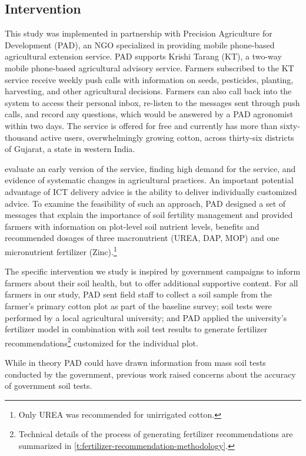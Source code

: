 \documentclass{article}
\begin{document}
\subsection{Intervention}

This study was implemented in partnership with Precision Agriculture for Development (PAD), an NGO specialized in providing mobile phone-based agricultural extension service. PAD supports Krishi Tarang (KT), a two-way mobile phone-based agricultural advisory service. Farmers subscribed to the KT service receive weekly push calls with information on seeds,  pesticides, planting, harvesting, and other agricultural decisions. Farmers can also call back into the system to access their personal inbox, re-listen to the messages sent through push calls, and record any questions, which would be answered by a PAD agronomist within two days. The service is offered for free and currently has more than sixty-thousand active users, overwhelmingly growing cotton, across thirty-six districts of Gujarat, a state in western India. 

\citet{Cole2020MobileizingSustainability} evaluate an early version of the service, finding high demand for the service, and evidence of systematic changes in agricultural practices. An important potential advantage of ICT delivery advice is the ability to deliver individually customized advice. To examine the feasibility of such an approach, PAD designed a set of messages that explain the importance of soil fertility management and provided farmers with information on plot-level soil nutrient levels, benefits and recommended dosages of three macronutrient (UREA, DAP, MOP) and one micronutrient fertilizer (Zinc).\footnote{Only UREA was recommended for unirrigated cotton.}

The specific intervention we study is inspired by government campaigns to inform farmers about their soil health, but to offer additional supportive content. For all farmers in our study, PAD sent field staff to collect a soil sample from the farmer's primary cotton plot as part of the baseline survey; soil tests were performed by a local agricultural university; and PAD applied the university’s fertilizer model in combination with soil test results to generate fertilizer recommendations\footnote{Technical details of the process of generating fertilizer recommendations are summarized in \ref{t:fertilizer-recommendation-methodology}.} customized for the individual plot. 

While in theory PAD could have drawn information from mass soil tests conducted by the government, previous work \citep{Cole2017TheAgriculture} raised concerns about the accuracy of government soil tests.
\end{document}
